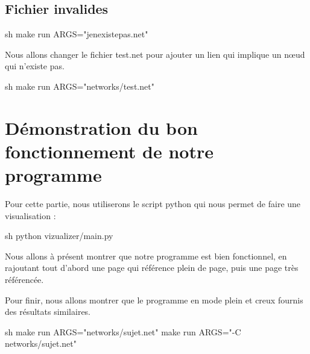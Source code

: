 \documentclass{NewTeX}
\begin{document}
\subsection{Fichier invalides}

\begin{code}{sh}
make run ARGS="jenexistepas.net"
\end{code}

Nous allons changer le fichier test.net pour ajouter un lien qui implique un nœud qui n'existe pas.

\begin{code}{sh}
make run ARGS="networks/test.net"
\end{code}


\section{Démonstration du bon fonctionnement de notre programme}

Pour cette partie, nous utiliserons le script python qui nous permet de faire une visualisation :

\begin{code}{sh}
python vizualizer/main.py
\end{code}

Nous allons à présent montrer que notre programme est bien fonctionnel, en rajoutant tout d'abord une page qui référence plein de page, puis une page très référencée.

Pour finir, nous allons montrer que le programme en mode plein et creux fournis des résultats similaires.
\begin{code}{sh}
make run ARGS="networks/sujet.net"
make run ARGS="-C networks/sujet.net"
\end{code}
\end{document}
